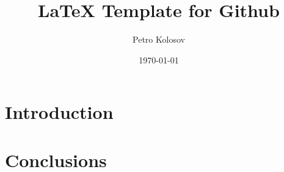 \documentclass[12pt,letterpaper,oneside,reqno]{amsart}
\title[LaTeX Template for Github]
{LaTeX Template for Github}
\author[Petro Kolosov]{Petro Kolosov}
\date{\today}
\numberwithin{equation}{section}
\begin{document}
    \begin{abstract}
        
    \end{abstract}

    \maketitle

    \tableofcontents


    \section{Introduction} \label{sec:introduction}
    


    \section{Conclusions}\label{sec:conclusions}
    

    
    
\end{document}

